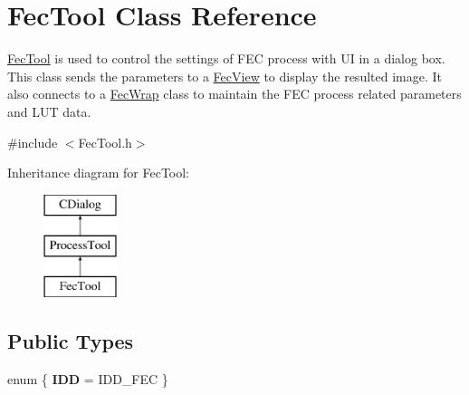 \hypertarget{class_fec_tool}{}\section{Fec\+Tool Class Reference}
\label{class_fec_tool}


\mbox{\hyperlink{class_fec_tool}{Fec\+Tool}} is used to control the settings of F\+EC process with UI in a dialog box. This class sends the parameters to a \mbox{\hyperlink{class_fec_view}{Fec\+View}} to display the resulted image. It also connects to a \mbox{\hyperlink{class_fec_wrap}{Fec\+Wrap}} class to maintain the F\+EC process related parameters and L\+UT data.  




{\ttfamily \#include $<$Fec\+Tool.\+h$>$}

Inheritance diagram for Fec\+Tool\+:\begin{figure}[H]
\begin{center}
\leavevmode
\includegraphics[height=3.000000cm]{class_fec_tool}
\end{center}
\end{figure}
\subsection*{Public Types}
\begin{DoxyCompactItemize}
\item 
\mbox{\label{class_fec_tool_ac41f0ce67dfecf0eb6c067e60f9e7e42}} 
enum \{ {\bfseries I\+DD} = I\+D\+D\+\_\+\+F\+EC
 \}
\end{DoxyCompactItemize}
